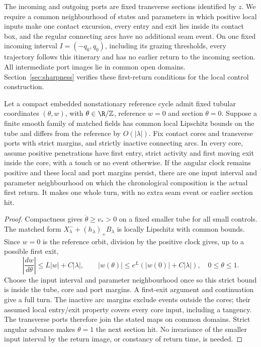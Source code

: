 The incoming and outgoing ports are fixed transverse sections identified
by $z$. We require a common neighbourhood of states and parameters in
which positive local inputs make one contact excursion, every entry and
exit lies inside its contact box, and the regular connecting arcs have
no additional seam event. On one fixed incoming interval $I=(-q_0,q_0)$,
including its grazing thresholds, every trajectory follows this itinerary
and has no earlier return to the incoming section. All intermediate port
images lie in common open domains. Section~\ref{sec:sharpness} verifies
these first-return conditions for the local control construction.

\begin{lemma}\label{lem:common-tube}
Let a compact embedded nonstationary reference cycle admit fixed tubular
coordinates $(\theta,w)$, with $\theta\in\R/\mathbb Z$, reference $w=0$
and section $\theta=0$. Suppose a finite smooth family of matched fields
has common local Lipschitz bounds on the tube and differs from the
reference by $O(|\lambda|)$. Fix contact cores and transverse ports with
strict margins, and strictly inactive connecting arcs. In every core,
assume positive penetrations have first entry, strict activity and first
moving exit inside the core, with a touch or no event otherwise.
If the angular clock remains positive and these local and port margins
persist, there are one input interval and parameter neighbourhood on which
the chronological composition is the actual first return. It makes one
whole turn, with no extra seam event or earlier section hit.
\end{lemma}

\begin{proof}
Compactness gives $\dot\theta\ge v_*>0$ on a fixed smaller tube for all
small controls. The matched form $X^-_\lambda+(h_\lambda)_+B_\lambda$
is locally Lipschitz with common bounds. Since $w=0$ is the reference
orbit, division by the positive clock gives, up to a possible first exit,
\[
 \left|\frac{dw}{d\theta}\right|\le L|w|+C|\lambda|,
 \qquad |w(\theta)|\le e^L(|w(0)|+C|\lambda|),\quad0\le\theta\le1.
\]
Choose the input interval and parameter neighbourhood once so this strict
bound is inside the tube, core and port margins. A first-exit argument and
continuation give a full turn. The inactive arc margins exclude events
outside the cores; their assumed local entry/exit property covers every
core input, including a tangency. The transverse ports therefore join the
stated maps on common domains. Strict angular advance makes $\theta=1$
the next section hit. No invariance of the smaller input interval by the
return image, or constancy of return time, is needed.
\end{proof}


